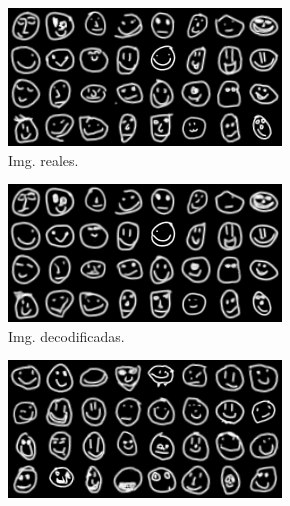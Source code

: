 \begin{figure}[H]
    \begin{subfigure}[b]{0.32\textwidth}
        \centering
        \includegraphics[width=\textwidth]{img/wgan-wae/real1.png}
        \caption{Img. reales.}
        \label{fig:real1}
    \end{subfigure}
    \hfill
    \begin{subfigure}[b]{0.32\textwidth}
        \centering
        \includegraphics[width=\textwidth]{img/wgan-wae/decoded1.png}
        \caption{Img. decodificadas.}
        \label{fig:decoded1}
    \end{subfigure}
    \hfill
    \begin{subfigure}[b]{0.32\textwidth}
        \centering
        \includegraphics[width=\textwidth]{img/wgan-wae/gen1.png}

\end{subfigure}
\end{figure}
